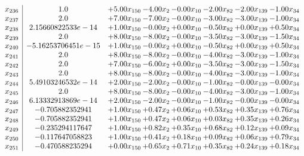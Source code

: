 \documentclass[8pt]{article}
\begin{document}
\[\begin{array}{c| c c@{\hskip 2pt} c@{\hskip 2pt} c@{\hskip 2pt} c@{\hskip 2pt} c@{\hskip 2pt} c@{\hskip 2pt} }
 x_{236}   &  1.0 & +  5.00 x_{150} & -4.00 x_{2} & -0.00 x_{10} & -2.00 x_{82} & -2.00 x_{139} & -1.00 x_{34}\\
 x_{237}   &  2.0 & +  7.00 x_{150} & -7.00 x_{2} & -0.00 x_{10} & -3.00 x_{82} & -3.00 x_{139} & -1.00 x_{34}\\
 x_{238}   &  2.15660822533e-14 & +  1.00 x_{150} & -0.00 x_{2} & +  0.00 x_{10} & -0.50 x_{82} & +  0.00 x_{139} & +  0.50 x_{34}\\
 x_{239}   &  2.0 & +  8.00 x_{150} & -8.00 x_{2} & -0.00 x_{10} & -3.50 x_{82} & -3.00 x_{139} & -1.50 x_{34}\\
 x_{240}   &  -5.16253706451e-15 & +  1.00 x_{150} & -0.00 x_{2} & +  0.00 x_{10} & -0.50 x_{82} & +  0.00 x_{139} & +  0.50 x_{34}\\
 x_{241}   &  2.0 & +  8.00 x_{150} & -8.00 x_{2} & -0.00 x_{10} & -4.00 x_{82} & -3.00 x_{139} & -1.00 x_{34}\\
 x_{242}   &  2.0 & +  7.00 x_{150} & -6.00 x_{2} & +  0.00 x_{10} & -3.50 x_{82} & -3.00 x_{139} & -1.50 x_{34}\\
 x_{243}   &  2.0 & +  8.00 x_{150} & -8.00 x_{2} & -0.00 x_{10} & -4.00 x_{82} & -3.00 x_{139} & -1.00 x_{34}\\
 x_{244}   &  5.49103246532e-14 & +  2.00 x_{150} & -2.00 x_{2} & -0.00 x_{10} & -1.00 x_{82} & -0.00 x_{139} & -0.00 x_{34}\\
 x_{245}   &  2.0 & +  8.00 x_{150} & -8.00 x_{2} & -0.00 x_{10} & -4.00 x_{82} & -3.00 x_{139} & -1.00 x_{34}\\
 x_{246}   &  6.13332913869e-14 & +  2.00 x_{150} & -2.00 x_{2} & -0.00 x_{10} & -1.00 x_{82} & -0.00 x_{139} & -0.00 x_{34}\\
 x_{247}   &  -0.705882352941 & +  1.00 x_{150} & +  0.47 x_{2} & +  0.06 x_{10} & +  0.53 x_{82} & +  0.35 x_{139} & +  0.76 x_{34}\\
 x_{248}   &  -0.705882352941 & +  1.00 x_{150} & +  0.47 x_{2} & +  0.06 x_{10} & +  0.03 x_{82} & +  0.35 x_{139} & +  0.26 x_{34}\\
 x_{249}   &  -0.235294117647 & +  1.00 x_{150} & +  0.82 x_{2} & +  0.35 x_{10} & +  0.68 x_{82} & +  0.12 x_{139} & +  0.09 x_{34}\\
 x_{250}   &  -0.117647058823 & +  1.00 x_{150} & +  0.41 x_{2} & +  0.18 x_{10} & +  0.09 x_{82} & +  0.06 x_{139} & +  0.79 x_{34}\\
 x_{251}   &  -0.470588235294 & +  0.00 x_{150} & +  0.65 x_{2} & +  0.71 x_{10} & +  0.35 x_{82} & +  0.24 x_{139} & +  0.18 x_{34}\\

\end{array}\]
\end{document}
